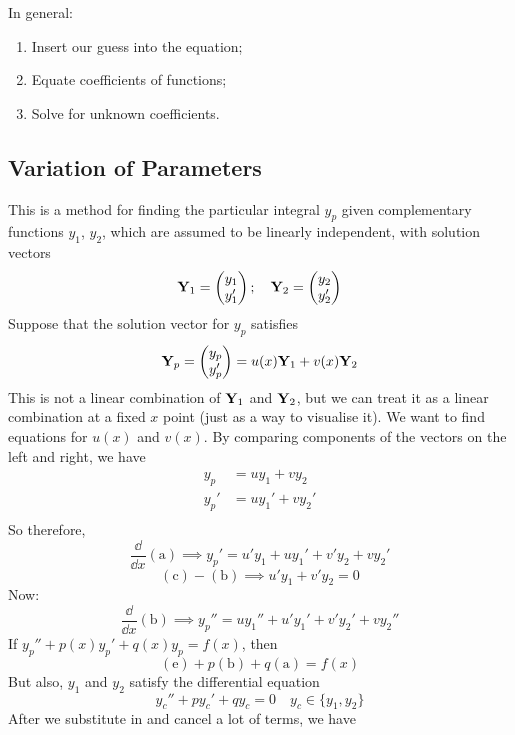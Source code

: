 \documentclass{article}
\begin{document}
In general:
\begin{enumerate}
    \item Insert our guess into the equation;
    \item Equate coefficients of functions;
    \item Solve for unknown coefficients.
\end{enumerate}

\subsection{Variation of Parameters}
This is a method for finding the particular integral $y_p$ given complementary functions $y_1$, $y_2$, which are assumed to be linearly independent, with solution vectors
\[ \vb Y_1 = \begin{pmatrix}
        y_1 \\ y_1'
    \end{pmatrix};\quad \vb Y_2 = \begin{pmatrix}
        y_2 \\ y_2'
    \end{pmatrix} \]
Suppose that the solution vector for $y_p$ satisfies
\begin{equation}\label{varparam1}
    \vb Y_p = \begin{pmatrix}
        y_p \\ y_p'
    \end{pmatrix} = u(x)\vb Y_1 + v(x)\vb Y_2
\end{equation}
This is not a linear combination of $\vb Y_1$ and $\vb Y_2$, but we can treat it as a linear combination at a fixed $x$ point (just as a way to visualise it). We want to find equations for $u(x)$ and $v(x)$. By comparing components of the vectors on the left and right, we have
\begin{align*}
    y_p  & = uy_1 + vy_2 \tag{a}   \\
    y_p' & = uy_1' + vy_2' \tag{b} \\
\end{align*}
So therefore,
\[ \frac{\dd}{\dd{x}}(\mathrm a) \implies y_p' = u'y_1 + uy_1' + v'y_2 + vy_2' \tag{c} \]
\[ (\mathrm c) - (\mathrm b) \implies u'y_1 + v'y_2 = 0 \tag{d} \]
Now:
\[ \frac{\dd}{\dd{x}}(\mathrm b) \implies y_p'' = uy_1'' + u'y_1' + v'y_2' + vy_2'' \tag{e} \]
If $y_p'' + p(x)y_p' + q(x)y_p = f(x)$, then
\[ (\mathrm e) + p(\mathrm b) + q(\mathrm a) = f(x) \]
But also, $y_1$ and $y_2$ satisfy the differential equation
\[ y_c'' + py_c' + qy_c = 0\quad y_c \in \{ y_1, y_2 \} \]
After we substitute in and cancel a lot of terms, we have
\end{document}
